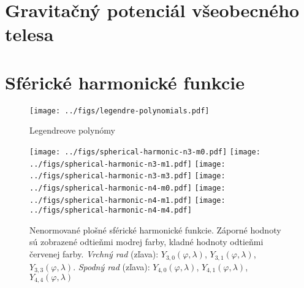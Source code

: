 \documentclass[a4paper, 12pt]{book}
\begin{document}






\chapter{Gravitačný potenciál všeobecného telesa}








\chapter{Sférické harmonické funkcie}




\begin{figure}[bt]
\centering
\texttt{[image: ../figs/legendre-polynomials.pdf]}
\caption{Legendreove polynómy}
\end{figure}




\begin{figure}[bt]
\centering
\texttt{[image: ../figs/spherical-harmonic-n3-m0.pdf]}
\texttt{[image: ../figs/spherical-harmonic-n3-m1.pdf]}
\texttt{[image: ../figs/spherical-harmonic-n3-m3.pdf]}
\texttt{[image: ../figs/spherical-harmonic-n4-m0.pdf]}
\texttt{[image: ../figs/spherical-harmonic-n4-m1.pdf]}
\texttt{[image: ../figs/spherical-harmonic-n4-m4.pdf]}
\caption{Nenormované plošné sférické harmonické funkcie.  Záporné hodnoty sú 
zobrazené odtieňmi modrej farby, kladné hodnoty odtieňmi červenej farby.  
\textit{Vrchný rad} (zľava): $Y_{3,0}(\varphi, \lambda)$, $Y_{3,1}(\varphi, 
\lambda)$, $Y_{3,3}(\varphi, \lambda)$.  \textit{Spodný rad} (zľava): 
$Y_{4,0}(\varphi, \lambda)$, $Y_{4,1}(\varphi, \lambda)$, $Y_{4,4}(\varphi, 
\lambda)$}
\label{fig:sh}
\end{figure}
\end{document}
